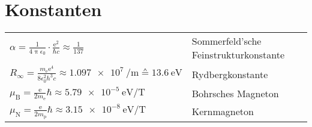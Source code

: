 \section{Konstanten}
\bgroup
\def\arraystretch{2}
\begin{tabular}{l|l}
	$\alpha = \frac{1}{4 \uppi \epsilon_0} \cdot \frac{\text{e}^2}{\hbar c} \approx \frac{1}{137}$&	Sommerfeld'sche Feinstrukturkonstante\\
	\hdashline
	$R_\infty = \frac{m_\text{e} \text{e}^4}{8 \epsilon_0^2 h^3 c} \approx \SI{1.097e7}{\per\meter} \corresponds \SI{13.6}{\eV}$&	Rydbergkonstante\\
	\hdashline
	$\mu_\text{B} = \frac{\text{e}}{2 m_\text{e}} \hbar \approx \SI{5.79e-5}{\eV\per\tesla}$&	Bohrsches Magneton\\
	$\mu_\text{N} = \frac{\text{e}}{2 m_\text{p}} \hbar \approx \SI{3.15e-8}{\eV\per\tesla}$& Kernmagneton\\
\end{tabular}
\egroup
